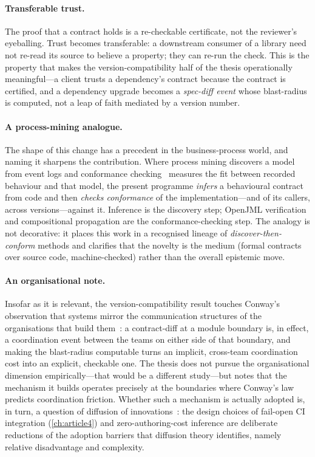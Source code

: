 \paragraph{Transferable trust.} The proof that a contract holds is a re-checkable
certificate, not the reviewer's eyeballing. Trust becomes transferable: a
downstream consumer of a library need not re-read its source to believe a property;
they can re-run the check. This is the property that makes the version-compatibility
half of the thesis operationally meaningful---a client trusts a dependency's
contract because the contract is certified, and a dependency upgrade becomes a
\emph{spec-diff event} whose blast-radius is computed, not a leap of faith mediated
by a version number.

\paragraph{A process-mining analogue.} The shape of this change has a precedent in
the business-process world, and naming it sharpens the contribution. Where process
mining discovers a model from event logs and conformance
checking~\citep{rozinat2008conformance,vanderaalst2016processmining,dumas2018bpm}
measures the fit between recorded behaviour and that model, the present programme
\emph{infers} a behavioural contract from code and then \emph{checks conformance}
of the implementation---and of its callers, across versions---against it. Inference
is the discovery step; OpenJML verification and compositional propagation are the
conformance-checking step. The analogy is not decorative: it places this work in a
recognised lineage of \emph{discover-then-conform} methods and clarifies that the
novelty is the medium (formal contracts over source code, machine-checked) rather
than the overall epistemic move.

\paragraph{An organisational note.} Insofar as it is relevant, the
version-compatibility result touches Conway's observation that systems mirror the
communication structures of the organisations that build them~\citep{conway1968committees}:
a contract-diff at a module boundary is, in effect, a coordination event between
the teams on either side of that boundary, and making the blast-radius computable
turns an implicit, cross-team coordination cost into an explicit, checkable one.
The thesis does not pursue the organisational dimension empirically---that would be
a different study---but notes that the mechanism it builds operates precisely at
the boundaries where Conway's law predicts coordination friction. Whether such a
mechanism is actually adopted is, in turn, a question of diffusion of
innovations~\citep{rogers2003diffusion}: the design choices of fail-open CI
integration (\cref{ch:article4}) and zero-authoring-cost inference are deliberate
reductions of the adoption barriers that diffusion theory identifies, namely
relative disadvantage and complexity.

